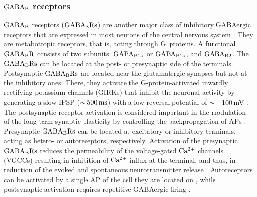     \subsubsection{$\rm GABA_B$ receptors}
      $\rm GABA_B$ receptors ($\rm GABA_BRs$) are another major class of
      inhibitory GABAergic receptors that are expressed in most neurons of the
      central nervous system \citep{Gassmann2012}. They are metabotropic
      receptors, that is, acting through G~proteins. A functional $\rm
      GABA_BR$ consists of two subunits: $\rm GABA_{B1a}$ or $\rm GABA_{B1a}$,
      and $\rm GABA_{B2}$. The $\rm GABA_BRs$ can be located at the post- or
      presynaptic side of the terminals.  Postsynaptic $\rm GABA_BRs$ are
      located near the glutamatergic synapses but not at the inhibitory ones.
      There, they activate the G-protein-activated inwardly rectifying
      potassium channels (GIRKs) that inhibit the neuronal activity by
      generating a slow IPSP ($\sim 500 \rm \, ms$) with a low reversal
      potential of $\sim - 100\, \rm mV$ \citep{Booker2013}. The postsynaptic
      receptor activation is considered important in the modulation of the
      long-term synaptic plasticity by controlling the backpropagation of APs
      \citep{Leung2006}. Presynaptic $\rm GABA_BRs$ can be located at
      excitatory or inhibitory terminals, acting as hetero- or autoreceptors,
      respectively. Activation of the presynaptic $\rm GABA_BRs$ reduces the
      permeability of the voltage-gated $\rm Ca^{2+}$ channels (VGCCs)
      resulting in inhibition of $\rm Ca^{2+}$ influx at the terminal, and
      thus, in reduction of the evoked and spontaneous neurotransmitter release
      \citep{Gekel2008}. Autoreceptors can be activated by a single AP of the
      cell they are located on \citep{Kobayashi2012}, while postsynaptic
      activation requires repetitive GABAergic firing \citep{Scanziani2000}.

